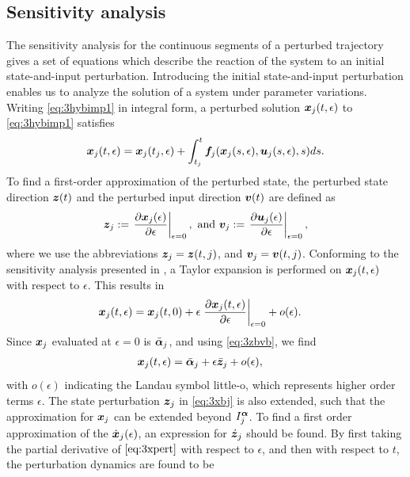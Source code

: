\documentclass[../DC2017114Bouma.tex]{subfiles}
\begin{document}
\subsection{Sensitivity analysis}\label{sec:3sens}
The sensitivity analysis for the continuous segments of a perturbed trajectory gives a set of equations which describe the reaction of the system to an initial state-and-input perturbation. Introducing the initial state-and-input perturbation enables us to analyze the solution of a system under parameter variations. Writing \eqref{eq:3hybimp1} in integral form, a perturbed solution ${\boldsymbol{x}}_j(t,\epsilon)$ to \eqref{eq:3hybimp1} satisfies
\begin{align}
{\boldsymbol{x}}_j(t,\epsilon) = {\boldsymbol{x}}_j(t_j,\epsilon) + \int_{t_j}^{t}{\boldsymbol{f}}_j({\boldsymbol{x}}_j(s,\epsilon),{\boldsymbol{u}}_j(s,\epsilon),s)ds.\label{eq:3xpert}
\end{align}
To find a first-order approximation of the perturbed state, the perturbed state direction ${\boldsymbol{z}}(t)$ and the perturbed input direction ${\boldsymbol{v}}(t)$ are defined as
\begin{align}
{\boldsymbol{z}}_j := \left.\frac{\partial{\boldsymbol{x}}_j(\epsilon)}{\partial\epsilon}\right|_{\epsilon=0},\text{ and } {\boldsymbol{v}}_j := \left.\frac{\partial{\boldsymbol{u}}_j(\epsilon)}{\partial\epsilon}\right|_{\epsilon=0},\label{eq:3zbvb}
\end{align}
where we use the abbreviations ${\boldsymbol{z}}_j = {\boldsymbol{z}}(t,j)$, and ${\boldsymbol{v}}_j = {\boldsymbol{v}}(t,j)$. Conforming to the sensitivity analysis presented in \cite{Khalil1996}, a Taylor expansion is performed on ${\boldsymbol{x}}_j(t,\epsilon)$ with respect to $\epsilon$. This results in
\begin{align}
{\boldsymbol{x}}_j(t,\epsilon) &= {\boldsymbol{x}}_j(t,0) + \epsilon\left.\frac{\partial{\boldsymbol{x}}_j(t,\epsilon)}{\partial\epsilon}\right|_{\epsilon=0} + o(\epsilon).\label{eq:3taylor}
\end{align}
Since ${\boldsymbol{x}}_j$ evaluated at $\epsilon=0$ is $\bar{\boldsymbol{\alpha}}_j$, and using \eqref{eq:3zbvb}, we find
\begin{align}
{\boldsymbol{x}}_j(t,\epsilon) &= \bar{\boldsymbol{\alpha}}_j + \epsilon\bar{{\boldsymbol{z}}}_j + o(\epsilon),\label{eq:3xbj}
\end{align}
with $o(\epsilon)$ indicating the Landau symbol little-o, which represents higher order terms $\epsilon$. The state perturbation ${\boldsymbol{z}}_j$ in \eqref{eq:3xbj} is also extended, such that the approximation for ${\boldsymbol{x}}_j$ can be extended beyond $I_j^{\boldsymbol{\alpha}}$. To find a first order approximation of the $\dot{{\boldsymbol{x}}}_j(\epsilon)$, an expression for $\dot{{\boldsymbol{z}}}_j$ should be found. By first taking the partial derivative of $\eqref{eq:3xpert}$ with respect to $\epsilon$, and then with respect to $t$, the perturbation dynamics are found to be
\end{document}
